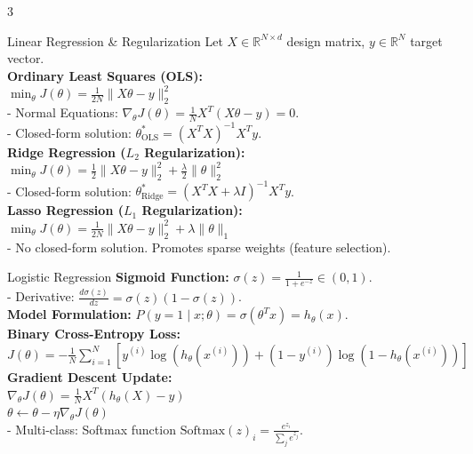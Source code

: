 \documentclass[10pt]{article}
\begin{document}
\begin{multicols*}{3}
\begin{mlBox}{Linear Regression \& Regularization}
Let $X \in \mathbb{R}^{N \times d}$ design matrix, $y \in \mathbb{R}^N$ target vector. \\
\textbf{Ordinary Least Squares (OLS):} \\
$\min_{\theta} J(\theta) = \frac{1}{2N} \|X\theta - y\|_2^2$ \\
- Normal Equations: $\nabla_{\theta} J(\theta) = \frac{1}{N} X^T(X\theta - y) = 0$. \\
- Closed-form solution: $\theta^*_{\text{OLS}} = (X^T X)^{-1} X^T y$. \\
\textbf{Ridge Regression ($L_2$ Regularization):} \\
$\min_{\theta} J(\theta) = \frac{1}{2} \|X\theta - y\|_2^2 + \frac{\lambda}{2} \|\theta\|_2^2$ \\
- Closed-form solution: $\theta^*_{\text{Ridge}} = (X^T X + \lambda I)^{-1} X^T y$. \\
\textbf{Lasso Regression ($L_1$ Regularization):} \\
$\min_{\theta} J(\theta) = \frac{1}{2N} \|X\theta - y\|_2^2 + \lambda \|\theta\|_1$ \\
- No closed-form solution. Promotes sparse weights (feature selection).
\end{mlBox}

\begin{mlBox}{Logistic Regression}
\textbf{Sigmoid Function:} $\sigma(z) = \frac{1}{1 + e^{-z}} \in (0, 1)$. \\
- Derivative: $\frac{d\sigma(z)}{dz} = \sigma(z)(1 - \sigma(z))$. \\
\textbf{Model Formulation:} $P(y=1 \mid x; \theta) = \sigma(\theta^T x) = h_{\theta}(x)$. \\
\textbf{Binary Cross-Entropy Loss:} \\
$J(\theta) = -\frac{1}{N} \sum_{i=1}^N \left[ y^{(i)} \log(h_{\theta}(x^{(i)})) + (1-y^{(i)}) \log(1-h_{\theta}(x^{(i)})) \right]$ \\
\textbf{Gradient Descent Update:} \\
$\nabla_{\theta} J(\theta) = \frac{1}{N} X^T(h_{\theta}(X) - y)$ \\
$\theta \leftarrow \theta - \eta \nabla_{\theta} J(\theta)$ \\
- Multi-class: Softmax function $\text{Softmax}(z)_i = \frac{e^{z_i}}{\sum_j e^{z_j}}$.
\end{mlBox}

\end{multicols*}
\end{document}
